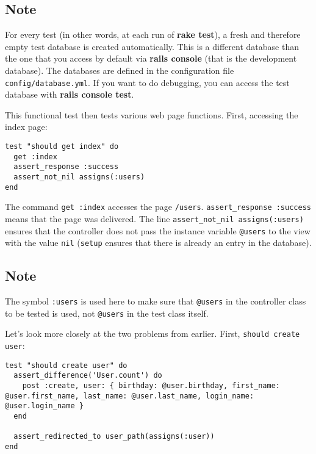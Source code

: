 \documentclass[a4paper]{book}
\newcounter{tab}[chapter]
\begin{document}
\subsection{Note}\label{note-39}

For every test (in other words, at each run of \textbf{rake test}), a fresh and therefore empty test database is created automatically. This is a different database than the one that you access by default via \textbf{rails console} (that is the development database). The databases are defined in the configuration file \texttt{config/database.yml}. If you want to do debugging, you can access the test database with \textbf{rails console test}.

This functional test then tests various web page functions. First, accessing the index page:

\begin{shaded}\begin{verbatim}
test "should get index" do
  get :index
  assert_response :success
  assert_not_nil assigns(:users)
end
\end{verbatim}\end{shaded}

The command \texttt{get :index} accesses the page \texttt{/users}. \texttt{assert\_response :success} means that the page was delivered. The line \texttt{assert\_not\_nil assigns(:users)} ensures that the controller does not pass the instance variable \texttt{@users} to the view with the value \texttt{nil} (\texttt{setup} ensures that there is already an entry in the database).

\subsection{Note}\label{note-40}

The symbol \texttt{:users} is used here to make sure that \texttt{@users} in the controller class to be tested is used, not \texttt{@users} in the test class itself.

Let's look more closely at the two problems from earlier. First, \texttt{should create user}:

\begin{shaded}\begin{verbatim}
test "should create user" do
  assert_difference('User.count') do
    post :create, user: { birthday: @user.birthday, first_name: @user.first_name, last_name: @user.last_name, login_name: @user.login_name }
  end

  assert_redirected_to user_path(assigns(:user))
end
\end{verbatim}\end{shaded}
\end{document}
